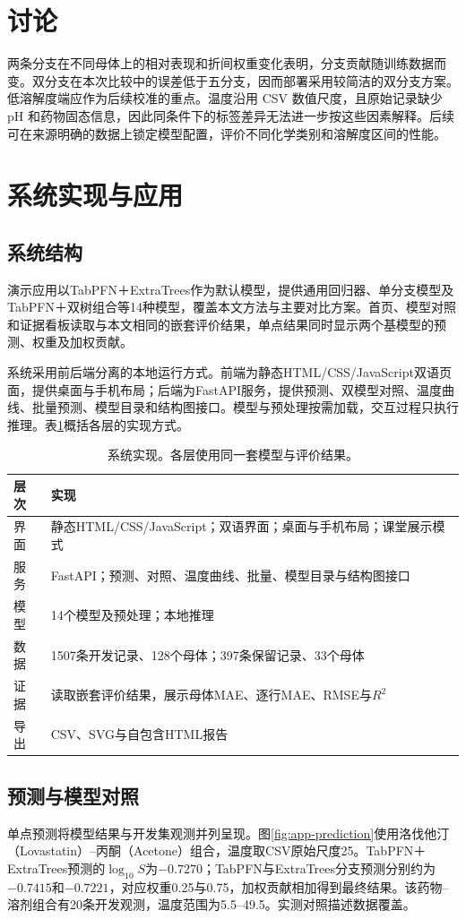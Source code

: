 \section{讨论}
两条分支在不同母体上的相对表现和折间权重变化表明，分支贡献随训练数据而变。双分支在本次比较中的误差低于五分支，因而部署采用较简洁的双分支方案。低溶解度端应作为后续校准的重点。温度沿用 CSV 数值尺度，且原始记录缺少 pH 和药物固态信息，因此同条件下的标签差异无法进一步按这些因素解释。后续可在来源明确的数据上锁定模型配置，评价不同化学类别和溶解度区间的性能。

\section{系统实现与应用}
\subsection{系统结构}
演示应用以TabPFN＋ExtraTrees作为默认模型，提供通用回归器、单分支模型及TabPFN＋双树组合等14种模型，覆盖本文方法与主要对比方案。首页、模型对照和证据看板读取与本文相同的嵌套评价结果，单点结果同时显示两个基模型的预测、权重及加权贡献。

系统采用前后端分离的本地运行方式。前端为静态HTML/CSS/JavaScript双语页面，提供桌面与手机布局；后端为FastAPI服务，提供预测、双模型对照、温度曲线、批量预测、模型目录和结构图接口。模型与预处理按需加载，交互过程只执行推理。表\ref{tab:app-impl}概括各层的实现方式。

\begin{table}[htbp]\centering\small
\caption{系统实现。各层使用同一套模型与评价结果。}\label{tab:app-impl}
\begin{tabularx}{\linewidth}{p{1.6cm}X}\toprule
层次 & 实现 \\ \midrule
界面 & 静态HTML/CSS/JavaScript；双语界面；桌面与手机布局；课堂展示模式 \\
服务 & FastAPI；预测、对照、温度曲线、批量、模型目录与结构图接口 \\
模型 & 14个模型及预处理；本地推理 \\
数据 & 1507条开发记录、128个母体；397条保留记录、33个母体 \\
证据 & 读取嵌套评价结果，展示母体MAE、逐行MAE、RMSE与$R^2$ \\
导出 & CSV、SVG与自包含HTML报告 \\
\bottomrule\end{tabularx}
\end{table}

\subsection{预测与模型对照}
单点预测将模型结果与开发集观测并列呈现。图\ref{fig:app-prediction}使用洛伐他汀（Lovastatin）--丙酮（Acetone）组合，温度取CSV原始尺度25。TabPFN＋ExtraTrees预测的$\log_{10}S$为$-0.7270$；TabPFN与ExtraTrees分支预测分别约为$-0.7415$和$-0.7221$，对应权重0.25与0.75，加权贡献相加得到最终结果。该药物--溶剂组合有20条开发观测，温度范围为5.5--49.5。实测对照描述数据覆盖。

